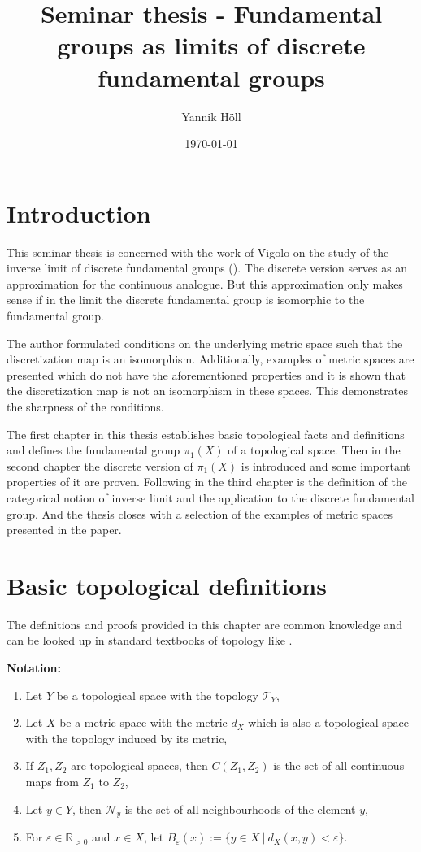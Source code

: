 \documentclass[a4paper, 11pt, twoside]{article}
\title{Seminar thesis - Fundamental groups as limits of discrete fundamental groups}
\author{Yannik Höll}
\date{\today}
\newcommand{\R}[0]{\mathbb{R}}
\newcommand{\T}[0]{\mathcal{T}}
\newcommand{\NB}[0]{\mathcal{N}}
\theoremstyle{break}
\theoremstyle{break}
\begin{document}
\nocite{*}

\maketitle

\section*{Introduction}
This seminar thesis is concerned with the work of Vigolo on the study of the inverse limit of discrete fundamental groups (\cite{vigolo2018fundamental}). The discrete version serves as an approximation
for the continuous analogue. But this approximation only makes sense if in the limit the discrete fundamental group is isomorphic to the fundamental group.

The author formulated conditions on the underlying metric space such that the discretization map is an isomorphism. 
Additionally, examples of metric spaces are presented which do not have the aforementioned properties and it is shown that the discretization map is not an isomorphism
in these spaces. This demonstrates the sharpness of the conditions.

The first chapter in this thesis establishes basic topological facts and definitions and defines the fundamental group $\pi_1(X)$ of a topological space.
Then in the second chapter the discrete version of $\pi_1(X)$ is introduced and some important properties of it are proven.
Following in the third chapter is the definition of the categorical notion of inverse limit and the application to the discrete fundamental group. 
And the thesis closes with a selection of the examples of metric spaces presented in the paper. 

\section{Basic topological definitions} \label{section-basic-defs}

The definitions and proofs provided in this chapter are common knowledge and can be looked up in standard textbooks of topology like \cite{munkres2000topology}.

\textbf{Notation:}
\begin{enumerate}
  \item Let $Y$ be a topological space with the topology $\T_Y$,
  \item Let $X$ be a metric space with the metric $d_X$ which is also a topological space with the topology induced by its metric,
  \item If $Z_1, Z_2$ are topological spaces, then $C(Z_1, Z_2)$ is the set of all continuous maps from $Z_1$ to $Z_2$,
  \item Let $y \in Y$, then $\NB_y$ is the set of all neighbourhoods of the element $y$,
  \item For $\varepsilon \in \R_{>0}$ and $x \in X$, let $B_{\varepsilon}(x) := \{ y\in X \: | \: d_X(x, y) < \varepsilon\}$.
\end{enumerate}
\end{document}

